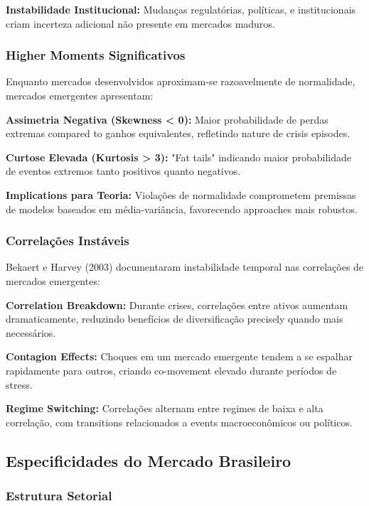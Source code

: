 \textbf{Instabilidade Institucional:} Mudanças regulatórias, políticas, e institucionais criam incerteza adicional não presente em mercados maduros.

\subsubsection{Higher Moments Significativos}

Enquanto mercados desenvolvidos aproximam-se razoavelmente de normalidade, mercados emergentes apresentam:

\textbf{Assimetria Negativa (Skewness < 0):} Maior probabilidade de perdas extremas compared to ganhos equivalentes, refletindo nature de crisis episodes.

\textbf{Curtose Elevada (Kurtosis > 3):} "Fat tails" indicando maior probabilidade de eventos extremos tanto positivos quanto negativos.

\textbf{Implications para Teoria:} Violações de normalidade comprometem premissas de modelos baseados em média-variância, favorecendo approaches mais robustos.

\subsubsection{Correlações Instáveis}

Bekaert e Harvey (2003) documentaram instabilidade temporal nas correlações de mercados emergentes:

\textbf{Correlation Breakdown:} Durante crises, correlações entre ativos aumentam dramaticamente, reduzindo benefícios de diversificação precisely quando mais necessários.

\textbf{Contagion Effects:} Choques em um mercado emergente tendem a se espalhar rapidamente para outros, criando co-movement elevado durante períodos de stress.

\textbf{Regime Switching:} Correlações alternam entre regimes de baixa e alta correlação, com transitions relacionados a events macroeconômicos ou políticos.

\subsection{Especificidades do Mercado Brasileiro}

\subsubsection{Estrutura Setorial}

